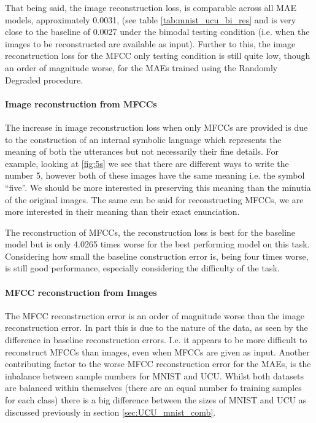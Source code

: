 That being said, the image reconstruction loss, is comparable across all MAE models, approximately 0.0031, (see table \autoref{tab:mnist_ucu_bi_res} and is very close to the baseline of 0.0027 under the bimodal testing condition (i.e. when the images to be reconstructed are available as input). Further to this, the image reconstruction loss for the MFCC only testing condition is still quite low, though an order of magnitude worse, for the MAEs trained using the Randomly Degraded procedure.

\paragraph{Image reconstruction from MFCCs}
The increase in image reconstruction loss when only MFCCs are provided is due to the construction of an internal symbolic language which represents the meaning of both the utterances but not necessarily their fine details. For example, looking at \autoref{fig:5s} we see that there are different ways to write the number 5, however both of these images have the same meaning i.e. the symbol ``five''. We should be more interested in preserving this meaning than the minutia of the original images. The same can be said for reconstructing MFCCs, we are more interested in their meaning than their exact enunciation.  

The reconstruction of MFCCs, the reconstruction loss is best for the baseline model but is only 4.0265 times worse for the best performing model on this task. Considering how small the baseline construction error is, being four times worse, is still good performance, especially considering the difficulty of the task.

\paragraph{MFCC reconstruction from Images}
The MFCC reconstruction error is an order of magnitude worse than the image reconstruction error. In part this is due to the nature of the data, as seen by the difference in baseline reconstruction errors. I.e. it appears to be more difficult to reconstruct MFCCs than images, even when MFCCs are given as input.
Another contributing factor to the worse MFCC reconstruction error for the MAEs, is the inbalance between sample numbers for MNIST and UCU. Whilst both datasets are balanced within themselves (there are an equal number fo training samples for each class) there is a big difference between the sizes of MNIST and UCU as discussed previously in section \autoref{sec:UCU_mnist_comb}. 

